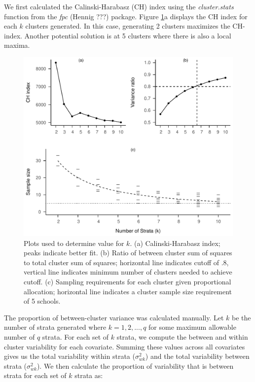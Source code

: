 \documentclass[man,floatsintext]{apa6}
\begin{document}
We first calculated the Calinski-Harabasz (CH) index using the \emph{cluster.stats} function from the \emph{fpc} (Hennig ???) package. Figure \ref{fig:fig-k-plots}a displays the CH index for each \(k\) clusters generated. In this case, generating 2 clusters maximizes the CH-index. Another potential solution is at 5 clusters where there is also a local maxima.

\begin{figure}[tbp]
\includegraphics[width=1\linewidth]{GenSamp-Paper_files/figure-latex/fig-k-plots-1} \caption{Plots used to determine value for $k$. (a) Calinski-Harabasz index; peaks indicate better fit. (b) Ratio of between cluster sum of squares to total cluster sum of squares; horizontal line indicates cutoff of .8, vertical line indicates minimum number of clusters needed to achieve cutoff. (c) Sampling requirements for each cluster given proportional allocation; horizontal line indicates a cluster sample size requirement of 5 schools.}\label{fig:fig-k-plots}
\end{figure}

The proportion of between-cluster variance was calculated manually. Let \(k\) be the number of strata generated where \(k = 1, 2, ..., q\) for some maximum allowable number of \(q\) strata. For each set of \(k\) strata, we compute the between and within cluster variability for each covariate. Summing these values across all covariates gives us the total variability within strata (\(\sigma_{wk}^2\)) and the total variability between strata (\(\sigma_{wk}^2\)). We then calculate the proportion of variability that is between strata for each set of \(k\) strata as:
\end{document}

